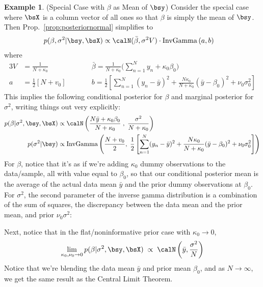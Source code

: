 \documentclass[12pt]{article}
\theoremstyle{plain}
\theoremstyle{definition}
\newtheorem{ex}[thm]{Example}
\theoremstyle{remark}
\newcommand{\ra}{\rightarrow}
\newcommand{\sumnN}{\sum^N_{n=1}}
\begin{document}
\clearpage
\begin{ex}(Special Case with $\beta$ as Mean of $\bsy$)
Consider the special case where $\bsX$ is a column vector of all ones so
that $\beta$ is simply the mean of $\bsy$.
Then Prop.~\ref{prop:posteriornormal} simplifies to
\begin{align}
  p(\beta, \sigma^2 | \bsy,\bsX)
  &\propto
  \calN(\bar{\beta},\sigma^2V)
  \cdot
  \operatorname{InvGamma}\left(a,b\right)
\end{align}
where
\begin{alignat*}{3}
  V&=\frac{1}{N+\kappa_0}
  \qquad
  &&\bar{\beta}
  = \frac{1}{N+\kappa_0}\bigg(\sumnN y_n + \kappa_0\beta_0\bigg)
  \\
  a &= \frac{1}{2}[N+v_0]
  \qquad&&b
  =
  \frac{1}{2}
  \left[
    \sumnN (y_n-\bar{y})^2
    + \frac{N\kappa_0}{N+\kappa_0}
      (\bar{y}-\beta_0)^2
    + \nu_0\sigma^2_0
  \right]
\end{alignat*}
This implies the following conditional posterior for $\beta$ and
marginal posterior for $\sigma^2$, writing things out very explicitly:
\begin{align*}
  p(\beta | \sigma^2,\bsy,\bsX)
  &\propto
  \calN\left(
    \frac{N\bar{y} + \kappa_0\beta_0}{N + \kappa_0}
  \; , \; \frac{\sigma^2}{N+\kappa_0}
  \right)
  \\
  p(\sigma^2|\bsy)
  &\propto
  \operatorname{InvGamma}\left(
    \frac{N+v_0}{2},\;
    \frac{1}{2}
    \left[
      \sumnN (y_n-\bar{y})^2
      + \frac{N\kappa_0}{N+\kappa_0}
        (\bar{y}-\beta_0)^2
      + \nu_0\sigma^2_0
    \right]
  \right)
\end{align*}
For $\beta$, notice that it's as if we're adding $\kappa_0$ dummy
observations to the data/sample, all with value equal to $\beta_0$, so
that our conditional posterior mean is the average of the actual data
mean $\bar{y}$ and the prior dummy observations at $\beta_0$.  For
$\sigma^2$, the second parameter of the inverse gamma distribution is a
combination of the sum of squares, the discrepancy between the data mean
and the prior mean, and prior $\nu_0\sigma^2$:


Next, notice that in the flat/noninformative prior case with
$\kappa_0\ra 0$,
\begin{align*}
  \lim_{\kappa_0,\nu_0\ra 0}
  p(\beta|\sigma^2,\bsy,\bsX)
  \;\propto\;
  \calN\left(\bar{y},\frac{\sigma^2}{N}\right)
\end{align*}
Notice that we're blending the data mean $\bar{y}$ and prior
mean $\beta_0$, and as $N\rightarrow \infty$, we get the same
result as the Central Limit Theorem.


\end{ex}
\end{document}
